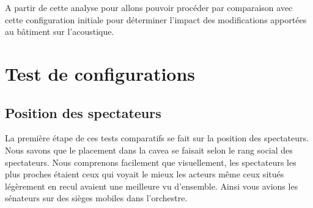 A partir de cette analyse pour allons pouvoir procéder par comparaison avec cette configuration initiale pour déterminer l'impact des modifications apportées au bâtiment sur l'acoustique.
		
\chapter{Test de configurations}
	\minitoc
	\newpage

\section{Position des spectateurs}
La première étape de ces tests comparatifs se fait sur la position des spectateurs. Nous savons que le placement dans la \gls{cavea} se faisait selon le rang social des spectateurs. Nous comprenons facilement que visuellement, les spectateurs les plus proches étaient ceux qui voyait le mieux les acteurs même ceux situés légèrement en recul avaient une meilleure vu d'ensemble. Ainsi vous avions les sénateurs sur des sièges mobiles dans l'orchestre.


